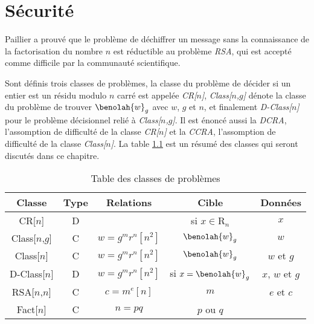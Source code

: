 \chapter{Sécurité}
\label{secu}
Paillier a prouvé que le problème de déchiffrer un message sans la con\-naissance 
de la factorisation du nombre $n$ est réductible au problème \emph{RSA}, qui est 
accepté comme difficile par la communauté scientifique. 

Sont définis trois classes de problèmes, 
la classe du problème de décider si un entier est un résidu 
modulo $n$ carré est appelée \emph{CR[$n$]}, \emph{Class[$n$,$g$]} dénote 
la classe du problème de trouver $\benolah{w}_g$ avec $w$, $g$ et $n$, et finalement \emph{D-Class[$n$]} pour le problème décisionnel 
relié à \emph{Class[$n$,$g$]}. Il est énoncé aussi la \emph{DCRA}, l'assomption de difficulté de la classe \emph{CR[$n$]} et la
\emph{CCRA}, l'assomption de difficulté de la classe \emph{Class[$n$]}. La table \ref{tab:classes} 
est un résumé des classes qui seront discutés dans ce chapitre.

\begin{table}[!htb]
	\centering
	\caption{Table des classes de problèmes}
	\label{tab:classes}
	\begin{tabular}{|c|c|c|c|c|}
		\hline
		Classe      	& Type\footnotemark[1]	 &Relations              & Cible                  & Données		     	\\
		\hline
		\hline
		CR[$n$]       	& D			 &                        & si $x\in\mathrm{R}_n$  & $x$	           	\\
		Class[$n$,$g$]  & C			 & $w = g^mr^n [n^2]$     & $\benolah{w}_g$        & $w$	          	\\
		Class[$n$]      & C			 & $w = g^mr^n [n^2]$     & $\benolah{w}_g$        & $w$ et $g$	          	\\
		D-Class[$n$]  	& D			 & $w = g^mr^n [n^2]$     & si $x = \benolah{w}_g$ & $x$, $w$ et $g$	   	\\
		\hline
		RSA[$n$,$n$]    & C			 & $c = m^e    [n]$       & $m$                    & $e$ et $c$ 		\\
		Fact[$n$]     	& C			 & $n = pq$ 		  & $p$ ou $q$             & 	 			\\
		\hline
	\end{tabular}
\end{table}

%	
%
%
%

